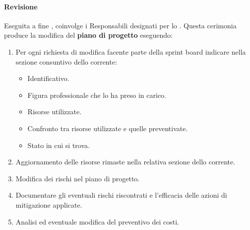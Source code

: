 \paragraph{Revisione}
Eseguita a fine , coinvolge i Responsabili designati per lo .
Questa cerimonia produce la modifica del \textbf{piano di progetto} eseguendo:
\begin{enumerate}
    \item Per ogni richiesta di modifica facente parte della sprint board indicare nella sezione consuntivo dello  corrente:
    \begin{itemize}
        \item Identificativo.
        \item Figura professionale che lo ha preso in carico.
        \item Risorse utilizzate.
        \item Confronto tra risorse utilizzate e quelle preventivate.
        \item Stato in cui si trova.
    \end{itemize}
    \item Aggiornamento delle risorse rimaste nella relativa sezione dello  corrente.
    \item Modifica dei rischi nel piano di progetto.
    \item Documentare gli eventuali rischi riscontrati e l'efficacia delle azioni di mitigazione applicate.
    \item Analisi ed eventuale modifica del preventivo dei costi.
\end{enumerate}

